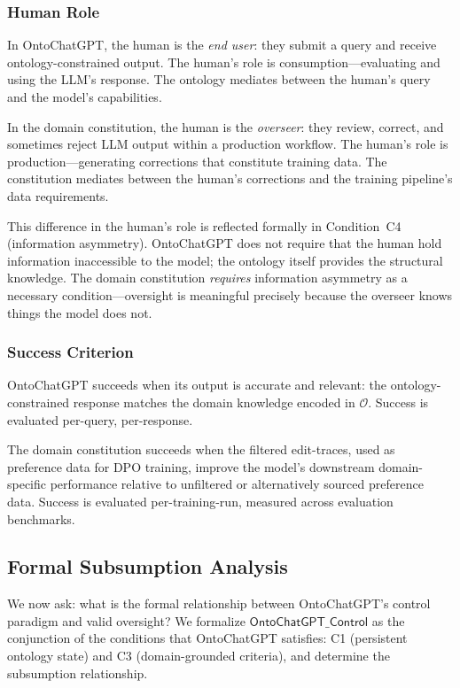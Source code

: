 \documentclass[11pt]{article}
\begin{document}
\subsubsection{Human Role}

In OntoChatGPT, the human is the \emph{end user}: they submit a query and receive ontology-constrained output.
The human's role is consumption---evaluating and using the LLM's response.
The ontology mediates between the human's query and the model's capabilities.

In the domain constitution, the human is the \emph{overseer}: they review, correct, and sometimes reject LLM output within a production workflow.
The human's role is production---generating corrections that constitute training data.
The constitution mediates between the human's corrections and the training pipeline's data requirements.

This difference in the human's role is reflected formally in Condition~C4 (information asymmetry).
OntoChatGPT does not require that the human hold information inaccessible to the model; the ontology itself provides the structural knowledge.
The domain constitution \emph{requires} information asymmetry as a necessary condition---oversight is meaningful precisely because the overseer knows things the model does not.

\subsubsection{Success Criterion}

OntoChatGPT succeeds when its output is accurate and relevant: the ontology-constrained response matches the domain knowledge encoded in $\mathcal{O}$.
Success is evaluated per-query, per-response.

The domain constitution succeeds when the filtered edit-traces, used as preference data for DPO training, improve the model's downstream domain-specific performance relative to unfiltered or alternatively sourced preference data.
Success is evaluated per-training-run, measured across evaluation benchmarks.

\subsection{Formal Subsumption Analysis}
\label{sec:subsumption}

We now ask: what is the formal relationship between OntoChatGPT's control paradigm and valid oversight?
We formalize $\mathsf{OntoChatGPT\_Control}$ as the conjunction of the conditions that OntoChatGPT satisfies: C1 (persistent ontology state) and C3 (domain-grounded criteria), and determine the subsumption relationship.
\end{document}
